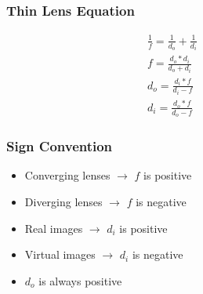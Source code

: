 \documentclass{article}
\begin{document}
\begin{figure}[ht]
    \begin{minipage}[t]{0.4\linewidth}
        \subsubsection{Thin Lens Equation}
        \begin{gather}
            \frac{1}{f} = \frac{1}{d_o} + \frac{1}{d_i} \\
            f = \frac{d_o*d_i}{d_o + d_i} \\
            d_o = \frac{d_i*f}{d_i - f} \\
            d_i = \frac{d_o*f}{d_o - f}
        \end{gather}
    \end{minipage}
    \hfill\vline\hfill
    \begin{minipage}[t]{0.4\linewidth}
        \subsubsection{Sign Convention}
        \begin{itemize}
            \item Converging lenses $\rightarrow$ $f$ is positive
            \item Diverging lenses $\rightarrow$ $f$ is negative
            \item Real images $\rightarrow$ $d_i$ is positive
            \item Virtual images $\rightarrow$ $d_i$ is negative
            \item $d_o$ is always positive
        \end{itemize}
    \end{minipage}
\end{figure}
\end{document}
